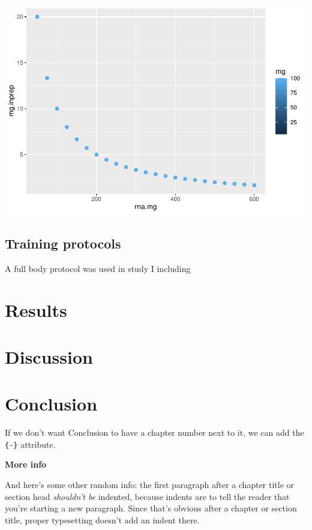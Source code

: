 \documentclass[twoside,10pt]{gihclass} %
\begin{document}
\includegraphics{thesis_files/figure-latex/unnamed-chunk-1-1.pdf}

\hypertarget{training-protocols}{%
\section{Training protocols}\label{training-protocols}}

A full body protocol was used in study I including

\hypertarget{results}{%
\chapter{Results}\label{results}}

\hypertarget{discussion}{%
\chapter{Discussion}\label{discussion}}

\hypertarget{conclusion}{%
\chapter*{Conclusion}\label{conclusion}}

If we don't want Conclusion to have a chapter number next to it, we can add the \texttt{\{-\}} attribute.

\textbf{More info}

And here's some other random info: the first paragraph after a chapter title or section head \emph{shouldn't be} indented, because indents are to tell the reader that you're starting a new paragraph. Since that's obvious after a chapter or section title, proper typesetting doesn't add an indent there.
\end{document}
